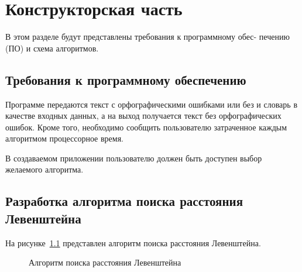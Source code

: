 \chapter{Конструкторская часть}

В этом разделе будут представлены требования к программному обес-
печению (ПО) и схема алгоритмов.

\section{Требования к программному обеспечению}

Программе передаются текст с орфографическими ошибками или без и словарь в качестве входных данных, а на выход получается текст без орфографических ошибок. Кроме того, необходимо сообщить пользователю затраченное каждым алгоритмом процессорное время.

В создаваемом приложении пользователю должен быть доступен выбор желаемого алгоритма.

\section{Разработка алгоритма поиска расстояния Левенштейна}

На рисунке~\ref{fig:levenstain} представлен алгоритм поиска расстояния Левенштейна.

\begin{figure}[h!]
	\caption{Алгоритм поиска расстояния Левенштейна}
	\label{fig:levenstain}
\end{figure}

